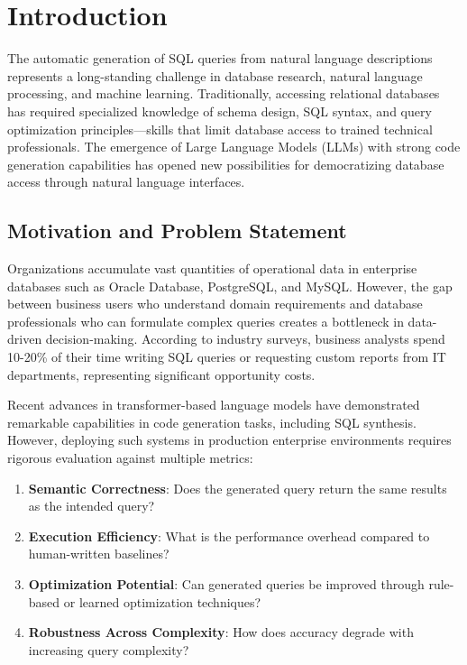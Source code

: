 \section{Introduction}

The automatic generation of SQL queries from natural language descriptions represents a long-standing challenge in database research, natural language processing, and machine learning. Traditionally, accessing relational databases has required specialized knowledge of schema design, SQL syntax, and query optimization principles---skills that limit database access to trained technical professionals. The emergence of Large Language Models (LLMs) with strong code generation capabilities has opened new possibilities for democratizing database access through natural language interfaces.

\subsection{Motivation and Problem Statement}

Organizations accumulate vast quantities of operational data in enterprise databases such as Oracle Database, PostgreSQL, and MySQL. However, the gap between business users who understand domain requirements and database professionals who can formulate complex queries creates a bottleneck in data-driven decision-making. According to industry surveys, business analysts spend 10-20\% of their time writing SQL queries or requesting custom reports from IT departments, representing significant opportunity costs.

Recent advances in transformer-based language models \cite{vaswani2017attention, devlin2018bert, brown2020language} have demonstrated remarkable capabilities in code generation tasks, including SQL synthesis. However, deploying such systems in production enterprise environments requires rigorous evaluation against multiple metrics:

\begin{enumerate}
    \item \textbf{Semantic Correctness}: Does the generated query return the same results as the intended query?
    \item \textbf{Execution Efficiency}: What is the performance overhead compared to human-written baselines?
    \item \textbf{Optimization Potential}: Can generated queries be improved through rule-based or learned optimization techniques?
    \item \textbf{Robustness Across Complexity}: How does accuracy degrade with increasing query complexity?
\end{enumerate}

